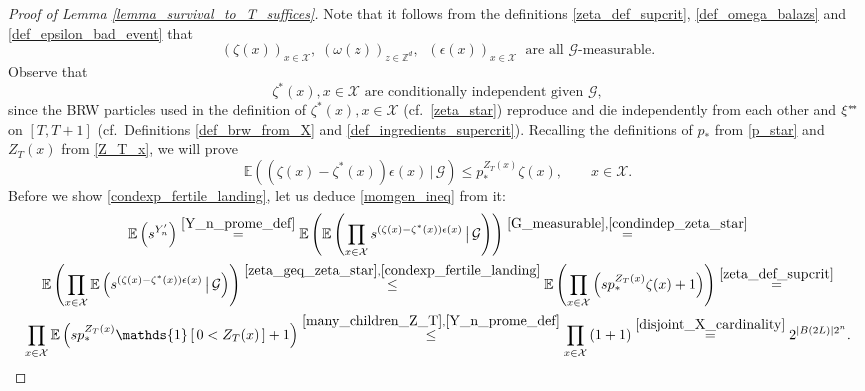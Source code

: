 \documentclass[a4paper,12pt]{article}
\newcommand{\sstar}{* \hspace{-.05cm} *}
\begin{document}
\begin{proof}[Proof of Lemma \ref{lemma_survival_to_T_suffices}]
 Note that it follows from the definitions  \eqref{zeta_def_supcrit}, \eqref{def_omega_balazs} and \eqref{def_epsilon_bad_event} that
 \begin{equation}\label{G_measurable}
 \left(\zeta(x)\right)_{x \in \mathcal{X}}, \; \left(\omega(z)\right)_{z \in \mathbb{Z}^d}, \; \; \left(\epsilon(x)\right)_{x \in \mathcal{X}}\;
 \text{ are all $\mathcal{G}$-measurable.}
 \end{equation}
  Observe that
\begin{equation}\label{condindep_zeta_star}
 \zeta^*(x), x \in \mathcal{X} \text{ are conditionally independent given } \mathcal{G},
\end{equation}
 since the BRW particles used in the definition of $\zeta^*(x), x\in \mathcal{X}$ (cf.\ \eqref{zeta_star})  reproduce and die independently from each other and $\xi^{\sstar}$ on $[T,T+1]$  (cf.\ Definitions \ref{def_brw_from_X} and \ref{def_ingredients_supercrit}).
Recalling the definitions of $p_*$ from \eqref{p_star} and $Z_T(x)$ from \eqref{Z_T_x},  we will prove
\begin{equation}\label{condexp_fertile_landing}
  \mathbb{E}\left( \left(\zeta(x) - \zeta^{*}(x) \right)\epsilon(x) \,   | \,  \mathcal{G} \right) \leq  p_*^{Z_T(x)} \zeta(x), \qquad x \in \mathcal{X}.
\end{equation}
 Before we show \eqref{condexp_fertile_landing}, let us deduce \eqref{momgen_ineq} from it:
\begin{multline} \label{here_is_where_we_use_many_children}
 \mathbb{E} \left( s^{Y'_n} \right)
   \stackrel{ \eqref{Y_n_prome_def} }{=}
   \mathbb{E} \left( \mathbb{E} \left( \prod_{x \in \mathcal{X} } s^{\left( \zeta(x) - \zeta^{*}(x) \right)\epsilon(x)} \, \big| \, \mathcal{G} \right) \right)
   \stackrel{ \eqref{G_measurable}, \eqref{condindep_zeta_star} }{=}
   \\
 \mathbb{E} \left(  \prod_{x \in \mathcal{X} } \mathbb{E} \left(  s^{\left( \zeta(x) - \zeta^{*}(x) \right)\epsilon(x)} \, \big| \, \mathcal{G} \right) \right)
    \stackrel{ \eqref{zeta_geq_zeta_star}, \eqref{condexp_fertile_landing} }{\leq } \mathbb{E}\left( \prod_{x \in \mathcal{X} }  \left( s p_*^{Z_T(x)} \zeta(x) +1  \right) \right)
    \stackrel{ \eqref{zeta_def_supcrit} }{=}
    \\
   \prod_{x \in \mathcal{X} }  \mathbb{E}  \left( s p_*^{Z_T(x)} \mathds{1}\left[ \, 0<  Z_T(x)  \, \right] +1  \right)
   \stackrel{ \eqref{many_children_Z_T}, \eqref{Y_n_prome_def} }{\leq } \prod_{x \in \mathcal{X} }   \left( 1 +1  \right)
   \stackrel{ \eqref{disjoint_X_cardinality} }{=} 2^{  |B(2L)| 2^n }.

\end{multline}
\end{proof}
\end{document}
